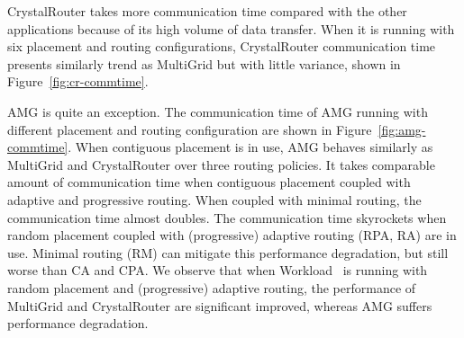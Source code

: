 CrystalRouter takes more communication time compared with the other applications because of its high volume of data transfer. 
When it is running with six placement and routing configurations, 
CrystalRouter communication time presents similarly trend as MultiGrid but with little variance, shown in Figure~\ref{fig:cr-commtime}. 


AMG is quite an exception. 
The communication time of AMG running with different placement and routing configuration are shown in Figure~\ref{fig:amg-commtime}.
When contiguous placement is in use, AMG behaves similarly as MultiGrid and CrystalRouter over three routing policies. 
It takes comparable amount of communication time when contiguous placement coupled with adaptive and progressive routing. 
When coupled with minimal routing, the communication time almost doubles. 
The communication time skyrockets when random placement coupled with (progressive) adaptive routing (RPA, RA) are in use. Minimal routing (RM) can mitigate this performance degradation, but still worse than CA and CPA. We observe that when Workload~ is running with random placement and (progressive) adaptive routing, 
the performance of MultiGrid and CrystalRouter are significant improved, whereas AMG suffers performance degradation. 


